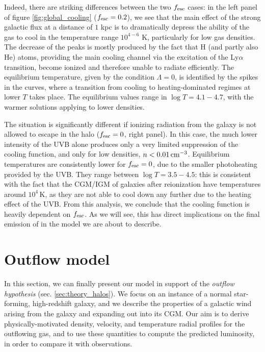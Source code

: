 Indeed, there are striking differences between the two $f_{\rm esc}$ cases: in the left panel of figure \ref{fig:global_cooling} ($f_{\rm esc}=0.2$), we see that the main effect of the strong galactic flux at a distance of $1$ kpc is to dramatically depress the ability of the gas to cool in the temperature range $10^{4-6}$ K, particularly for low gas densities. The decrease of the peaks is mostly produced by the fact that H (and partly also He) atoms, providing the main cooling channel via the excitation of the Ly$\alpha$ transition, become ionized and therefore unable to radiate efficiently. The equilibrium temperature, given by the condition $\Lambda=0$, is identified by the spikes in the curves, where a transition from cooling to heating-dominated regimes at lower $T$ takes place. The equilibrium values range in $\log T=4.1 - 4.7$, with the warmer solutions applying to lower densities. 

The situation is significantly different if ionizing radiation from the galaxy is not allowed to escape in the halo ($f_{\rm esc}=0$, right panel). In this case, the much lower intensity of the UVB alone produces only a very limited suppression of the cooling function, and only for low densities, $n < 0.01\, \rm cm^{-3}$. Equilibrium temperatures are consistently lower for $f_{\rm esc}=0$, due to the smaller photoheating provided by the UVB. They range between $\log T=3.5 - 4.5$: this is consistent with the fact that the CGM/IGM of galaxies after reionization have temperatures around $10^4\,\mathrm{K}$, as they are not able to cool down any further due to the heating effect of the UVB. From this analysis, we conclude that the cooling function is heavily dependent on $f_{\rm esc}$. As we will see, this has direct implications on the final emission of \CII in the model we are about to describe. 



 \section{Outflow model}\label{sec:outflow_model}



In this section, we can finally present our model in support of the \textit{outflow hypothesis} (sec. \ref{sec:theory_halos}). We focus on an instance of a normal star-forming, high-redshift galaxy, and we describe the properties of a galactic wind arising from the galaxy and expanding out into its CGM. Our aim is to derive physically-motivated density, velocity, and temperature radial profiles for the outflowing gas, and to use these quantities to compute the predicted \CII luminosity, in order to compare it with observations. 

